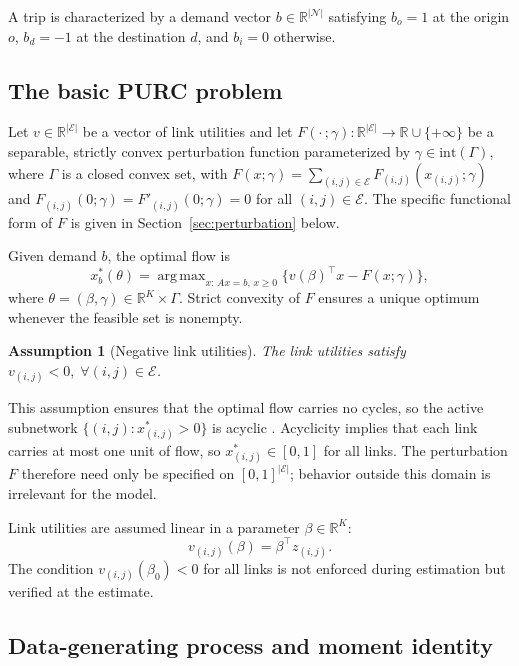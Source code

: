 \documentclass[12pt]{article}
\newcommand{\cN}{\mathcal{N}}
\newcommand{\cE}{\mathcal{E}}
\DeclareMathOperator*{\argmax}{arg\,max}
\newtheorem{assumption}{Assumption}
\begin{document}
A trip is characterized by a demand vector $b \in \mathbb{R}^{|\cN|}$ satisfying $b_o = 1$ at the origin $o$, $b_d = -1$ at the destination $d$, and $b_i = 0$ otherwise.

\subsection{The basic PURC problem}

Let $v \in \mathbb{R}^{|\cE|}$ be a vector of link utilities and let $F(\cdot\,; \gamma) \colon \mathbb{R}^{|\cE|} \to \mathbb{R} \cup \{+\infty\}$ be a separable, strictly convex perturbation function parameterized by $\gamma \in \mathrm{int}( \Gamma)$, where $\Gamma$ is a closed convex set, with $F(x; \gamma) = \sum_{(i,j) \in \cE} F_{(i,j)}(x_{(i,j)}; \gamma)$ and $F_{(i,j)}(0; \gamma) = F'_{(i,j)}(0; \gamma) = 0$ for all $(i,j) \in \cE$. The specific functional form of $F$ is given in Section~\ref{sec:perturbation} below.


Given demand $b$, the optimal flow is
\[
    x^*_b(\theta) = \argmax_{x:\, Ax = b,\, x \geq 0}
        \bigl\{ v(\beta)^\top x - F(x; \gamma) \bigr\},
\]
where $\theta = (\beta, \gamma) \in \mathbb{R}^K \times \Gamma$.
Strict convexity of $F$ ensures a unique optimum whenever the feasible set is nonempty.

\begin{assumption}[Negative link utilities]\label{ass:neg_utility}
    The link utilities satisfy $v_{(i,j)} < 0, \; \forall (i,j) \in \cE$.
\end{assumption}
This assumption ensures that the optimal flow carries no cycles, so the active subnetwork $\{(i,j) : x^*_{(i,j)} > 0\}$ is acyclic \citep{fosgerau2022perturbed}. Acyclicity implies that each link carries at most one unit of flow, so $x^*_{(i,j)} \in [0, 1]$ for all links. The perturbation $F$ therefore need only be specified on $[0, 1]^{|\cE|}$; behavior outside this domain is irrelevant for the model.

Link utilities are assumed linear in a parameter
$\beta \in \mathbb{R}^K$:
\[
    v_{(i,j)}(\beta) = \beta^\top z_{(i,j)}.
\]
The condition $v_{(i,j)}(\beta_0) < 0$ for all links is not enforced during estimation but verified at the estimate.

\subsection{Data-generating process and moment identity}\label{sec:dgp}
\end{document}
